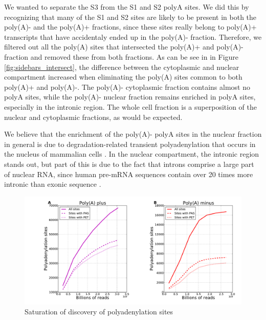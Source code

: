 We wanted to separate the S3 from the S1 and S2 polyA sites. We did this by
recognizing that many of the S1 and S2 sites are likely to be present in both
the poly(A)- and the poly(A)+ fractions, since these sites really belong to
poly(A)+ transcripts that have accidentaly ended up in the poly(A)- fraction.
Therefore, we filtered out all the poly(A) sites that intersected the poly(A)+
and poly(A)- fraction and removed these from both fractions. As can be see in
in Figure \ref{fig:sidebars_intersect}, the difference between the cytoplasmic
and nuclear compartment increased when eliminating the poly(A) sites common to
both poly(A)+ and poly(A)-. The poly(A)- cytoplasmic fraction contains almost
no polyA sites, while the poly(A)- nuclear fraction remains enriched in polyA
sites, especially in the intronic region. The whole cell fraction is a
superposition of the nuclear and cytoplasmic fractions, as would be expected.

We believe that the enrichment of the poly(A)- polyA sites in the nuclear
fraction in general is due to degradation-related transient polyadenylation
that occurs in the nucleus of mammalian cells \cite{lemay_nuclear_2010,
lacava_rna_2005, wyers_cryptic_2005}. In the nuclear compartment, the intronic
region stands out, but part of this is due to the fact that introns comprise a
large part of nuclear RNA, since human pre-mRNA sequences contain over 20 times
more intronic than exonic sequence \cite{venter_sequence_2001}.

\begin{figure}[htb]
	\begin{center}
		\includegraphics[scale=0.3]{figures/polyadenylation/Saturation_plot_2+.pdf}
	\end{center}
	\caption{Saturation of discovery of polyadenylation sites}
	\label{fig:saturation}
\end{figure}

